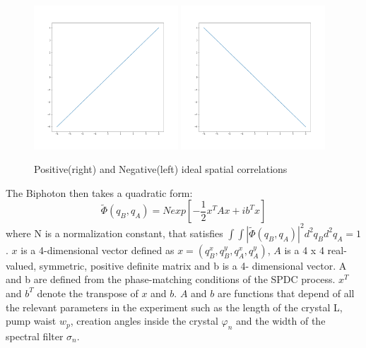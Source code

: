 \begin{figure}[h!]
\centering
{  \includegraphics[width=0.48\textwidth]{Figures/idealPositiveCorrelation.png} }
{  \includegraphics[width=0.48\textwidth]{Figures/idealNegativeCorrelation.png} }
\caption{Positive(right) and Negative(left) ideal spatial correlations}
 \label{fig:idealCorre}
\end{figure}

The Biphoton then takes a quadratic form\cite{spatiocorrelations}:
\begin{equation}
\label{eq:quadratic}
\tilde{\Phi}(q_B,q_A)=N exp\left[ -\frac{1}{2}x^T A x + i b^T x \right]
\end{equation}
where N is a normalization constant, that satisfies $\int \int | \tilde{\Phi}(q_B,q_A)|^2 d^2 q_B d^2 q_A = 1$. 
$x$ is a 4-dimensional vector defined as $x = (q^x_B, q^y_B ,q^x_A,q^y_A )$, $A$ 
is a 4 x 4 real-valued, symmetric, positive definite matrix and b is a 4- dimensional vector. 
A and b are defined from the phase-matching conditions of the SPDC process. $x^T$ and $b^T$ denote
 the transpose of $x$ and $b$. $A$ and $b$ are functions that depend of all the relevant 
parameters in the experiment such as the length of the crystal L, pump waist $w_p$, creation 
angles inside the crystal $\varphi_n$ and the width of the spectral filter $\sigma_n$.


